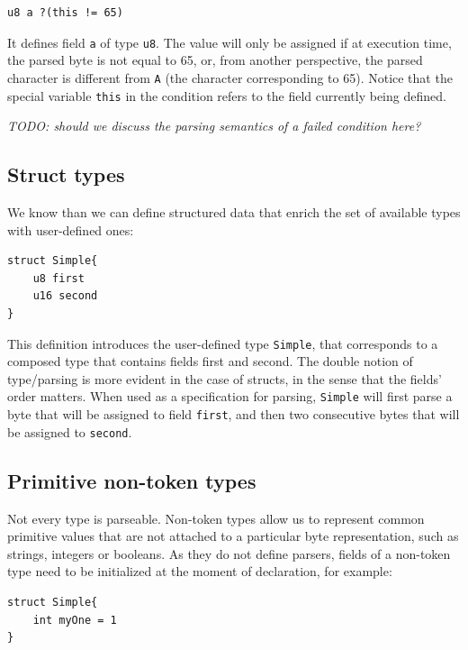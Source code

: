 \documentclass[10pt,oneside]{article}
\begin{document}
\begin{verbatim}
u8 a ?(this != 65)
\end{verbatim}

It defines field \texttt{a} of type \texttt{u8}. The value will only be
assigned if at execution time, the parsed byte is not equal to 65, or,
from another perspective, the parsed character is different from
\texttt{A} (the character corresponding to 65). Notice that the special
variable \texttt{this} in the condition refers to the field currently
being defined.

\emph{TODO: should we discuss the parsing semantics of a failed
condition here?}

\hypertarget{struct-types}{%
\subsection{Struct types}\label{struct-types}}

We know than we can define structured data that enrich the set of
available types with user-defined ones:

\begin{verbatim}
struct Simple{
    u8 first
    u16 second
}
\end{verbatim}

This definition introduces the user-defined type \texttt{Simple}, that
corresponds to a composed type that contains fields first and second.
The double notion of type/parsing is more evident in the case of
structs, in the sense that the fields' order matters. When used as a
specification for parsing, \texttt{Simple} will first parse a byte that
will be assigned to field \texttt{first}, and then two consecutive bytes
that will be assigned to \texttt{second}.

\hypertarget{primitive-non-token-types}{%
\subsection{Primitive non-token types}\label{primitive-non-token-types}}

Not every type is parseable. Non-token types allow us to represent
common primitive values that are not attached to a particular byte
representation, such as strings, integers or booleans. As they do not
define parsers, fields of a non-token type need to be initialized at the
moment of declaration, for example:

\begin{verbatim}
struct Simple{
    int myOne = 1
}
\end{verbatim}
\end{document}
